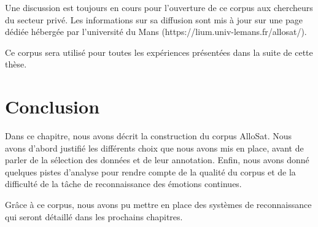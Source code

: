 Une discussion est toujours en cours pour l'ouverture de ce corpus aux chercheurs du secteur privé. Les informations sur sa diffusion sont mis à jour sur une page dédiée hébergée par l'université du Mans (https://lium.univ-lemans.fr/allosat/).

Ce corpus sera utilisé pour toutes les expériences présentées dans la suite de cette thèse.

\section{Conclusion}
Dans ce chapitre, nous avons décrit la construction du corpus AlloSat. Nous avons d'abord justifié les différents choix que nous avons mis en place, avant de parler de la sélection des données et de leur annotation. Enfin, nous avons donné quelques pistes d'analyse pour rendre compte de la qualité du corpus et de la difficulté de la tâche de reconnaissance des émotions continues.

Grâce à ce corpus, nous avons pu mettre en place des systèmes de reconnaissance qui seront détaillé dans les prochains chapitres.
